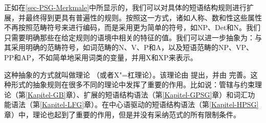 正如在\ref{sec-PSG-Merkmale}中所显示的，我们可以对具体的短语结构规则进行扩展，并最终得到更具有普遍性的规则。按照这一方式，诸如人称、数和性这些属性不再按照范畴符号来进行编码，而是采用更为简单的符号，如NP、Det和N。我们只需要明确那些在给定规则的语境中相关的特征的值。我们可以进一步抽象为：与其采用明确的范畴符号，如词范畴的N、V、P和A，以及短语范畴的NP、VP、PP和AP，不如简单地采用词类的变量，并用X和XP来表示。

这种抽象的方式就叫做\xbarc 理论 （或者X"=杠理论）。该理论由 \citet{Chomsky70a}提出，并由 \citet{Jackendoff77a}完善。这种形式的抽象规则在很多不同的理论中发挥了重要的作用。比如说：管辖与约束理论（第\ref{Kapitel-GB}章）、扩展的短语结构语法（第\ref{Kapitel-GPSG}章）和词汇功能语法（第\ref{Kapitel-LFG}章）。在中心语驱动的短语结构语法（第\ref{Kapitel-HPSG}章）中，\xbarc 理论也起到了重要的作用，但是并没有采纳\xbarc 范式的所有限制条件。

